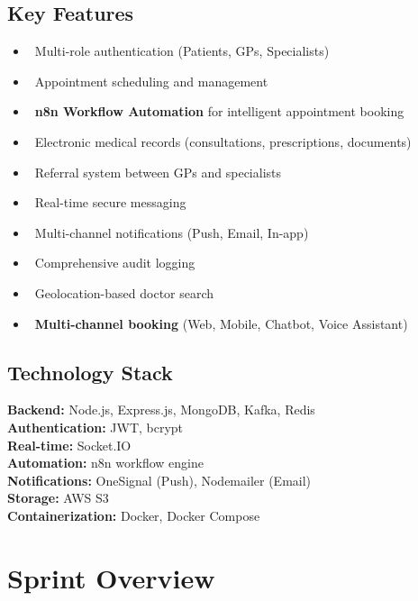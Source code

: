 \documentclass[11pt,a4paper]{article}
\begin{document}
\subsection{Key Features}

\begin{itemize}[leftmargin=*]
    \item \faUsers\ Multi-role authentication (Patients, GPs, Specialists)
    \item \faCalendarAlt\ Appointment scheduling and management
    \item \faCogs\ \textbf{n8n Workflow Automation} for intelligent appointment booking
    \item \faFileMedical\ Electronic medical records (consultations, prescriptions, documents)
    \item \faExchangeAlt\ Referral system between GPs and specialists
    \item \faComments\ Real-time secure messaging
    \item \faBell\ Multi-channel notifications (Push, Email, In-app)
    \item \faClipboardList\ Comprehensive audit logging
    \item \faMapMarkerAlt\ Geolocation-based doctor search
    \item \faMobileAlt\ \textbf{Multi-channel booking} (Web, Mobile, Chatbot, Voice Assistant)
\end{itemize}

\subsection{Technology Stack}

\begin{infobox}
\textbf{Backend:} Node.js, Express.js, MongoDB, Kafka, Redis\\
\textbf{Authentication:} JWT, bcrypt\\
\textbf{Real-time:} Socket.IO\\
\textbf{Automation:} n8n workflow engine\\
\textbf{Notifications:} OneSignal (Push), Nodemailer (Email)\\
\textbf{Storage:} AWS S3\\
\textbf{Containerization:} Docker, Docker Compose
\end{infobox}

\newpage

\section{Sprint Overview}
\end{document}
